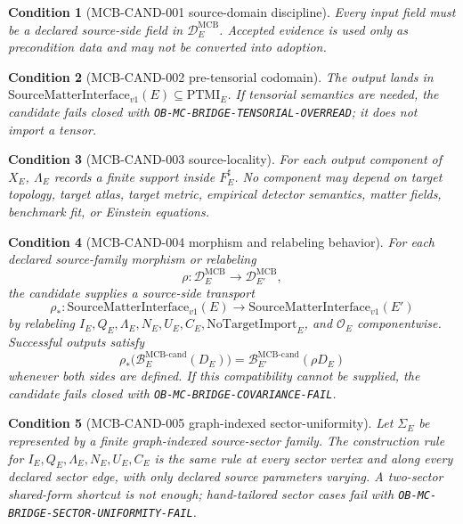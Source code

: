 \documentclass[11pt]{article}
\newcommand{\SMI}{\mathrm{SourceMatterInterface}_{v1}}
\newcommand{\PTMI}{\mathrm{PTMI}}
\newcommand{\NoTargetImport}{\mathrm{NoTargetImport}}
\newtheorem{condition}{Condition}
\begin{document}
\begin{condition}[MCB-CAND-001 source-domain discipline]
Every input field must be a declared source-side field in
\(\mathcal{D}^{\mathrm{MCB}}_E\). Accepted evidence is used only as
precondition data and may not be converted into adoption.
\end{condition}

\begin{condition}[MCB-CAND-002 pre-tensorial codomain]
The output lands in \(\SMI(E)\subseteq\PTMI_E\). If tensorial semantics are
needed, the candidate fails closed with
\texttt{OB-MC-BRIDGE-TENSORIAL-OVERREAD}; it does not import a tensor.
\end{condition}

\begin{condition}[MCB-CAND-003 source-locality]
For each output component of \(X_E\), \(\Lambda_E\) records a finite support
inside \(F_E^\sharp\). No component may depend on target topology, target
atlas, target metric, empirical detector semantics, matter fields, benchmark
fit, or Einstein equations.
\end{condition}

\begin{condition}[MCB-CAND-004 morphism and relabeling behavior]
For each declared source-family morphism or relabeling
\[
  \rho:\mathcal{D}^{\mathrm{MCB}}_E \to
  \mathcal{D}^{\mathrm{MCB}}_{E'},
\]
the candidate supplies a source-side transport
\[
  \rho_*:\SMI(E)\to\SMI(E')
\]
by relabeling \(I_E,Q_E,\Lambda_E,N_E,U_E,C_E,\NoTargetImport_E\), and
\(\mathcal{O}_E\) componentwise. Successful outputs satisfy
\[
  \rho_*\bigl(\mathcal{B}^{\mathrm{MCB\text{-}cand}}_E(D_E)\bigr)
  =
  \mathcal{B}^{\mathrm{MCB\text{-}cand}}_{E'}(\rho D_E)
\]
whenever both sides are defined. If this compatibility cannot be supplied,
the candidate fails closed with \texttt{OB-MC-BRIDGE-COVARIANCE-FAIL}.
\end{condition}

\begin{condition}[MCB-CAND-005 graph-indexed sector-uniformity]
Let \(\Sigma_E\) be represented by a finite graph-indexed source-sector
family. The construction rule for \(I_E,Q_E,\Lambda_E,N_E,U_E,C_E\) is the
same rule at every sector vertex and along every declared sector edge, with
only declared source parameters varying. A two-sector shared-form shortcut is
not enough; hand-tailored sector cases fail with
\texttt{OB-MC-BRIDGE-SECTOR-UNIFORMITY-FAIL}.
\end{condition}
\end{document}
